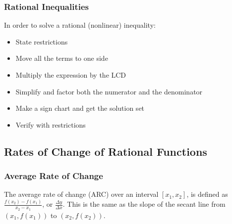 \documentclass{article}
\begin{document}
	\subsubsection{Rational Inequalities}
	In order to solve a rational (nonlinear) inequality:
	\begin{itemize}
		\item State restrictions
		\item Move all the terms to one side
		\item Multiply the expression by the LCD
		\item Simplify and factor both the numerator and the denominator
		\item Make a sign chart and get the solution set
		\item Verify with restrictions
	\end{itemize}
	\subsection{Rates of Change of Rational Functions}
	\subsubsection{Average Rate of Change}
	The average rate of change (ARC) over an interval $[x_1, x_2]$, is defined as $\frac{f(x_2)-f(x_1)}{x_2-x_1}$, or $\frac{\Delta y}{\Delta x}$. This is the same as the slope of the secant line from $(x_1, f(x_1))$ to $(x_2, f(x_2))$.
\end{document}
